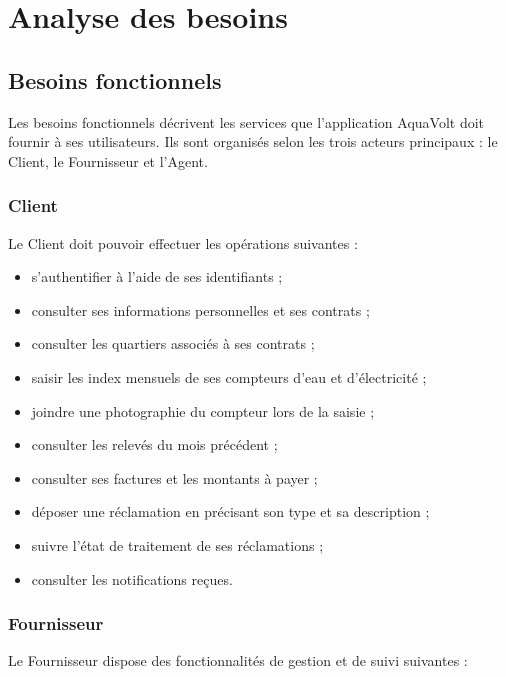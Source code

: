 
\chapter{Analyse des besoins}
\label{chap:besoins}

\section{Besoins fonctionnels}

Les besoins fonctionnels décrivent les services que l'application AquaVolt doit fournir à ses utilisateurs. Ils sont organisés selon les trois acteurs principaux : le Client, le Fournisseur et l'Agent.

\subsection{Client}

Le Client doit pouvoir effectuer les opérations suivantes :

\begin{itemize}[leftmargin=*]
    \item s'authentifier à l'aide de ses identifiants ;
    \item consulter ses informations personnelles et ses contrats ;
    \item consulter les quartiers associés à ses contrats ;
    \item saisir les index mensuels de ses compteurs d'eau et d'électricité ;
    \item joindre une photographie du compteur lors de la saisie ;
    \item consulter les relevés du mois précédent ;
    \item consulter ses factures et les montants à payer ;
    \item déposer une réclamation en précisant son type et sa description ;
    \item suivre l'état de traitement de ses réclamations ;
    \item consulter les notifications reçues.
\end{itemize}

\subsection{Fournisseur}

Le Fournisseur dispose des fonctionnalités de gestion et de suivi suivantes :

